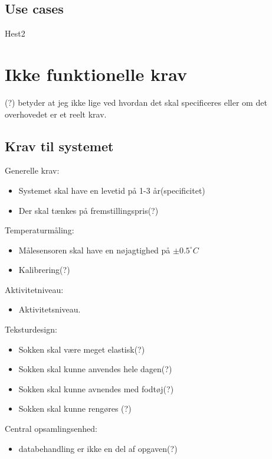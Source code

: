 \subsection{Use cases}
Hest2

\section{Ikke funktionelle krav}
(?) betyder at jeg ikke lige ved hvordan det skal specificeres eller om det overhovedet er et reelt krav.\\
\subsection{Krav til systemet}
Generelle krav:\\
\begin{itemize}
\item Systemet skal have en levetid på 1-3 år(specificitet)
\item Der skal tænkes på fremstillingspris(?)
\end{itemize}

Temperaturmåling:\\
\begin{itemize}
\item Målesensoren skal have en nøjagtighed på $\pm0.5 ^{\circ}C$
\item Kalibrering(?)
\end{itemize}

Aktivitetniveau:\\
\begin{itemize}
\item Aktivitetsniveau.
\end{itemize}

Teksturdesign:\\
\begin{itemize}
\item Sokken skal være meget elastisk(?)
\item Sokken skal kunne anvendes hele dagen(?)
\item Sokken skal kunne avnendes med fodtøj(?)
\item Sokken skal kunne rengøres (?)
\end{itemize}

Central opsamlingsenhed:\\
\begin{itemize}
\item databehandling er ikke en del af opgaven(?)
\end{itemize}

